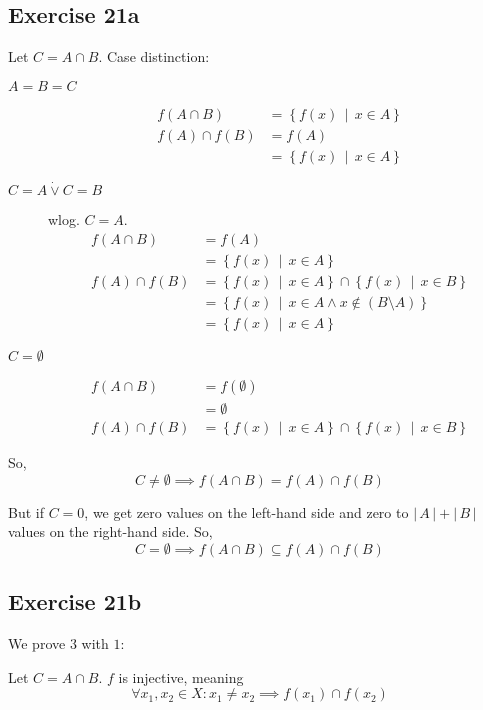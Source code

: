 \documentclass[a4paper]{article}
\theoremstyle{definition}
\newcommand\setdef[2]{\left\{#1\,\middle|\,#2\right\}}
\newcommand\card[1]{\left|\,#1\,\right|}
\begin{document}
\subsection{Exercise 21a}

Let $C = A \cap B$. Case distinction:
\begin{description}
  \item[$A = B = C$]
    \begin{align*}
         f(A \cap B) &= \setdef{f(x)}{x \in A} \\
      f(A) \cap f(B) &= f(A) \\
                     &= \setdef{f(x)}{x \in A}
    \end{align*}
  \item[$C = A \dot\lor C = B$]
    wlog. $C = A$.
    \begin{align*}
         f(A \cap B) &= f(A) \\
                     &= \setdef{f(x)}{x \in A} \\
      f(A) \cap f(B) &= \setdef{f(x)}{x \in A} \cap \setdef{f(x)}{x \in B} \\
                     &= \setdef{f(x)}{x \in A \land x \not\in (B \setminus A)} \\
                     &= \setdef{f(x)}{x \in A}
    \end{align*}
  \item[$C = \emptyset$]
    \begin{align*}
      f(A \cap B)    &= f(\emptyset) \\
                     &= \emptyset \\
      f(A) \cap f(B) &= \setdef{f(x)}{x \in A} \cap \setdef{f(x)}{x \in B}
    \end{align*}
\end{description}

So,
\[ C \neq \emptyset \implies f(A \cap B) = f(A) \cap f(B) \]

But if $C = 0$, we get zero values on the left-hand side and zero to $\card{A} + \card{B}$ values on the right-hand side.
So,
\[ C = \emptyset \implies f(A \cap B) \subseteq f(A) \cap f(B) \]

\subsection{Exercise 21b}

We prove $3$ with $1$:

Let $C = A \cap B$. $f$ is injective, meaning
\[ \forall x_1, x_2 \in X: x_1 \neq x_2 \implies f(x_1) \cap f(x_2) \]
\end{document}
